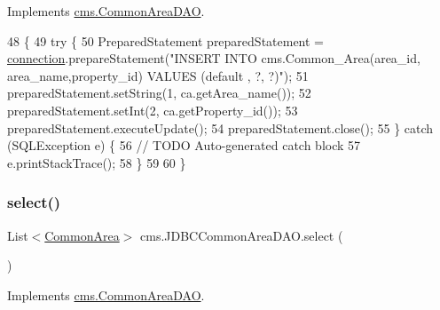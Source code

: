 Implements \mbox{\hyperlink{interfacecms_1_1_common_area_d_a_o_affdfddab399e6cb4249b3918962a1a4f}{cms.\+Common\+Area\+D\+AO}}.


\begin{DoxyCode}
48                                       \{
49         \textcolor{keywordflow}{try} \{
50             PreparedStatement preparedStatement = \mbox{\hyperlink{classcms_1_1_j_d_b_c_common_area_d_a_o_a9cd45620d4795fbf71bb1e4408e2100f}{connection}}.prepareStatement(\textcolor{stringliteral}{"INSERT INTO
       cms.Common\_Area(area\_id, area\_name,property\_id) VALUES (default , ?, ?)"});
51             preparedStatement.setString(1,  ca.getArea\_name());
52             preparedStatement.setInt(2,  ca.getProperty\_id());
53             preparedStatement.executeUpdate();
54             preparedStatement.close();
55         \} \textcolor{keywordflow}{catch} (SQLException e) \{
56             \textcolor{comment}{// TODO Auto-generated catch block}
57             e.printStackTrace();
58         \}
59          
60     \}
\end{DoxyCode}
\mbox{\label{classcms_1_1_j_d_b_c_common_area_d_a_o_af23b754d7207a376a3b4995b333ccb40}} 
\subsubsection{\texorpdfstring{select()}{select()}}
{\footnotesize\ttfamily List$<$\mbox{\hyperlink{classcms_1_1_common_area}{Common\+Area}}$>$ cms.\+J\+D\+B\+C\+Common\+Area\+D\+A\+O.\+select (\begin{DoxyParamCaption}{ }\end{DoxyParamCaption})\hspace{0.3cm}{\ttfamily [inline]}}



Implements \mbox{\hyperlink{interfacecms_1_1_common_area_d_a_o_ae4c9d5d62bc59942fc165f8ff9865542}{cms.\+Common\+Area\+D\+AO}}.


